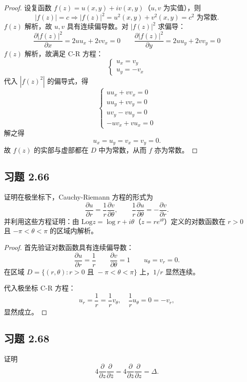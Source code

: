 \documentclass[11pt,a4paper]{article}
\newcommand{\Log}{\mathrm{Log}}
\theoremstyle{definition}
\begin{document}
\begin{proof}
设复函数 $f(z) = u(x,y) + iv(x,y)$（$u,v$ 为实值），则
\[
  |f(z)| = c \Rightarrow |f(z)|^2 = u^2(x,y) + v^2(x,y) = c^2 \text{ 为常数}.
\]
$f(z)$ 解析，故 $u,v$ 具有连续偏导数。对 $|f(z)|^2$ 求偏导：
\[
  \frac{\partial |f(z)|^2}{\partial x} = 2uu_x+2vv_x = 0 \qquad
  \frac{\partial |f(z)|^2}{\partial y} = 2uu_y+2vv_y = 0
\]
$f(z)$ 解析，故满足 C-R 方程：
\[
  \begin{cases}
    u_x = v_y \\
    u_y = -v_x
  \end{cases}
\]
代入 $|f(z)^2|$ 的偏导式，得
\[
  \begin{cases}
    uu_x + vv_x = 0 \\
    uu_y + vv_y = 0 \\
    uv_y - vu_y = 0 \\
    -uv_x + vu_x = 0
  \end{cases}
\]
解之得
\[
  u_x = u_y = v_x = v_y = 0.
\]
故 $f(z)$ 的实部与虚部都在 $D$ 中为常数，从而 $f$ 亦为常数。
\end{proof}

\subsection{习题 2.66}

证明在极坐标下，Cauchy-Riemann 方程的形式为
\[
  \frac{\partial u}{\partial r} = \frac{1}{r}\frac{\partial v}{\partial \theta},
  \qquad
  \frac{1}{r}\frac{\partial u}{\partial \theta} = -\frac{\partial
  v}{\partial r}.
\]
并利用这些方程证明：由 $\Log z = \log r + i\theta$（$z = re^{i\theta}$）定义的对数函数在 $r > 0$ 且 $-\pi < \theta < \pi$ 的区域内解析。

\begin{proof}
首先验证对数函数具有连续偏导数：
\[
  \frac{\partial u}{\partial r} = \frac{1}{r} \qquad
  \frac{\partial v}{\partial \theta} = 1 \qquad
  u_\theta = v_r = 0.
\]
在区域 $D = \{(r, \theta) : r > 0 \text{ 且 } -\pi < \theta < \pi\}$ 上，$1/r$ 显然连续。

代入极坐标 C-R 方程：
\[
  u_r = \frac{1}{r} = \frac{1}{r} v_\theta,\quad \frac{1}{r} u_\theta = 0 = -v_r,
\]
显然成立。
\end{proof}

\subsection{习题 2.68}

证明
\[
  4 \frac{\partial}{\partial z} \frac{\partial}{\partial \bar{z}} = 4
  \frac{\partial}{\partial \bar{z}} \frac{\partial}{\partial z} = \Delta.
\]
\end{document}
